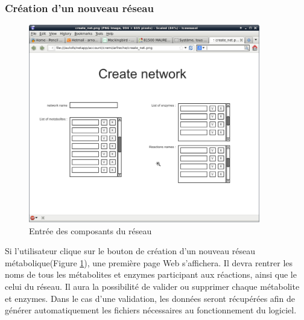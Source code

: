 \pagebreak	
			
\subsubsection{Création d'un nouveau réseau}

\begin{figure}[!ht]
	\begin{center}
  		\includegraphics[width=0.90\textwidth]{create_net.png} 
  		\caption{Entrée des composants du réseau} 
  		\label{reseau}
	\end{center}
\end{figure}

Si l'utilisateur clique sur le bouton de création d'un nouveau réseau métabolique(Figure \ref{reseau}), une première page Web s'affichera. Il devra rentrer les noms de tous les métabolites et enzymes participant aux réactions, ainsi que le celui du réseau. Il aura la possibilité de valider ou supprimer chaque métabolite et enzymes. Dans le cas d'une validation, les données seront récupérées afin de générer automatiquement les fichiers nécessaires au fonctionnement du logiciel.

\pagebreak

